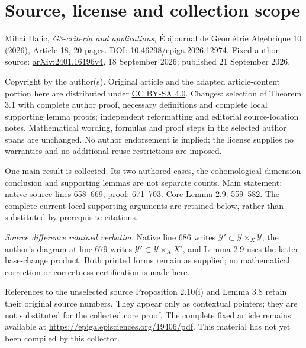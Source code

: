 \section*{Source, license and collection scope}
\noindent Mihai Halic, \emph{G3-criteria and applications}, \'Epijournal de G\'eom\'etrie Alg\'ebrique 10 (2026), Article 18, 20 pages. DOI: \href{https://doi.org/10.46298/epiga.2026.12974}{10.46298/epiga.2026.12974}. Fixed author source: \href{https://arxiv.org/abs/2401.16196v4}{arXiv:2401.16196v4}, 18 September 2026; published 21 September 2026.
\par\medskip
\noindent Copyright by the author(s). Original article and the adapted article-content portion here are distributed under \href{https://creativecommons.org/licenses/by-sa/4.0/}{CC BY-SA 4.0}. Changes: selection of Theorem 3.1 with complete author proof, necessary definitions and complete local supporting lemma proofs; independent reformatting and editorial source-location notes. Mathematical wording, formulas and proof steps in the selected author spans are unchanged. No author endorsement is implied; the license supplies no warranties and no additional reuse restrictions are imposed.
\par\medskip
\noindent One main result is collected. Its two authored cases, the cohomological-dimension conclusion and supporting lemmas are not separate counts. Main statement: native source lines 658--669; proof: 671--703. Core Lemma 2.9: 559--582. The complete current local supporting arguments are retained below, rather than substituted by prerequisite citations.
\par\medskip
\noindent\textit{Source difference retained verbatim.} Native line 686 writes $\mathcal Y'\subset\mathcal Y\times_X\mathcal Y$; the author's diagram at line 679 writes $\mathcal Y'\subset\mathcal Y\times_X X'$, and Lemma 2.9 uses the latter base-change product. Both printed forms remain as supplied; no mathematical correction or correctness certification is made here.
\par\medskip
\noindent References to the unselected source Proposition 2.10(i) and Lemma 3.8 retain their original source numbers. They appear only as contextual pointers; they are not substituted for the collected core proof. The complete fixed article remains available at \url{https://epiga.episciences.org/19406/pdf}. This material has not yet been compiled by this collector.
\setcounter{section}{1}
\makeatletter
{}
\makeatother
